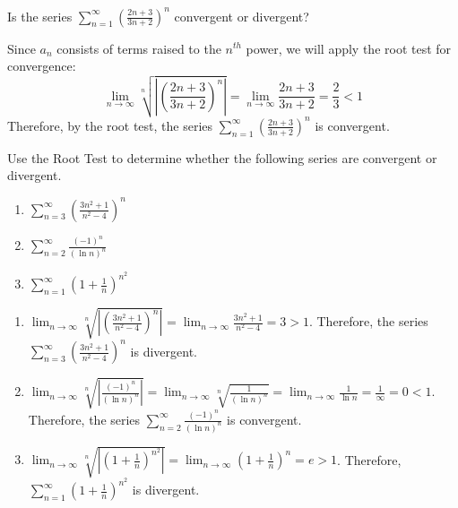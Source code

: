 \begin{Worked}
\begin{Problem}
Is the series $\sum_{n=1}^\infty \left( \frac{2n + 3}{3n + 
2} \right)^n$ convergent or divergent?
\end{Problem}
\begin{Solution}
Since $a_n$ consists of terms raised to the $n^{th}$ power, 
we will apply the root test for convergence:
$$\lim_{n \to \infty} \sqrt[n]{\left| \left( \frac{2n+3}{3n+2} \right)^n 
\right|} = \lim_{n \to \infty} \frac{2n+3}{3n+2} = \frac{2}{3} < 1$$ 
Therefore, by the root test, the series $\sum_{n=1}^\infty \left( \frac{2n + 
3}{3n + 2} \right)^n$ is convergent. 
\end{Solution}
\end{Worked}

\begin{Exercise}[label=root1]
Use the Root Test to determine whether the following series are convergent or 
divergent.
\begin{enumerate}
\item $\sum_{n=3}^\infty \left( \frac{3n^2 + 1}{n^2 - 4} \right)^n$
\item $\sum_{n=2}^\infty \frac{(-1)^{n}}{(\ln{n})^n}$
\item $\sum_{n=1}^\infty \left( 1+ \frac{1}{n} \right)^{n^2}$
\end{enumerate}
\vspace{50mm}
\end{Exercise}

\begin{Answer}[ref=root1] \begin{enumerate} \item $\lim_{n \to \infty} \sqrt[n]{\left| \left( \frac{3n^2 + 1}{n^2 - 4} \right)^n 
\right|} = \lim_{n \to \infty} \frac{3n^2 + 1}{n^2 - 4} = 3 >1$. Therefore, 
the series $\sum_{n=3}^\infty \left( \frac{3n^2 + 1}{n^2 - 4} \right)^n$ is 
divergent.
\item $\lim_{n \to \infty} \sqrt[n]{\left| \frac{(-1)^{n}}{(\ln{n})^n} \right|} 
= \lim_{n \to \infty} \sqrt[n]{\frac{1}{(\ln{n})^n}} = \lim_{n \to \infty} 
\frac{1}{\ln{n}} = \frac{1}{\infty} = 0 < 1$. Therefore, the series $\sum_
{n=2}^\infty \frac{(-1)^{n}}{(\ln{n})^n}$ is convergent.
\item $\lim_{n \to \infty} \sqrt[n]{\left| \left( 1 + \frac{1}{n} \right)^{n^2} 
\right|} = \lim_{n \to \infty} \left(1 + \frac{1}{n} \right)^n = e > 1$. 
Therefore, $\sum_{n=1}^\infty \left( 1+ \frac{1}{n} \right)^{n^2}$ is divergent. 
\end{enumerate}
\end{Answer}

